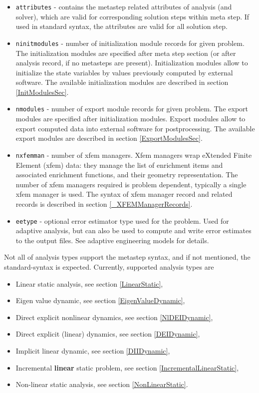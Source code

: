 \documentclass[a4paper]{article}
\newcommand{\param}[1]{\texttt{#1}} %
\begin{document}
\begin{itemize}
\begin{itemize}
(uses Sloan algorithm). By default, profile optimization is not
performed. It will not work in parallel mode.
\item \param{attributes} - contains the metastep related attributes of
analysis (and solver), which are valid for corresponding solution
steps within meta step. If used in standard syntax, the attributes are
valid for all solution step.
\item \param{ninitmodules} - number of initialization module records for given
problem. The initialization modules are specified after meta step section (or
after analysis record, if no metasteps are present). Initialization modules
allow to initialize the state variables by values previously computed by 
external software. The available initialization modules are described in section
\ref{InitModulesSec}.
\item \param{nmodules} - number of export module records for given
problem. The export modules are specified after initialization modules. Export modules
allow to export computed data into external software for
postprocessing. The available export modules are described in section
\ref{ExportModulesSec}.
\item \param{nxfemman} - number of xfem managers.
Xfem managers wrap eXtended Finite Element (xfem) data: they  manage the list of enrichment items and associated enrichment functions, and their geometry representation. The number of xfem managers required is problem dependent, typically a single xfem manager is used. The syntax of xfem manager record and related records is described in section \ref{_XFEMManagerRecords}.
\item \param{eetype} - optional error estimator type used for the problem.
Used for adaptive analysis, but can also be used to compute and write error estimates to the output files. See adaptive engineering models for details.
\end{itemize}

\end{itemize}
Not all of analysis types support the metastep syntax, and if
not mentioned, the standard-syntax is expected.
Currently, supported analysis types are

\begin{itemize}
\item Linear static analysis, see section \ref{LinearStatic},
\item Eigen value dynamic, see section \ref{EigenValueDynamic},
\item Direct explicit  nonlinear dynamics, see section
\ref{NlDEIDynamic},
\item Direct explicit (linear) dynamics, see section \ref{DEIDynamic},
\item Implicit linear dynamic, see section \ref{DIIDynamic},
\item Incremental \textbf{linear} static problem, see section \ref{IncrementalLinearStatic},
\item Non-linear static analysis, see section \ref{NonLinearStatic}.
\end{itemize}
\end{document}
